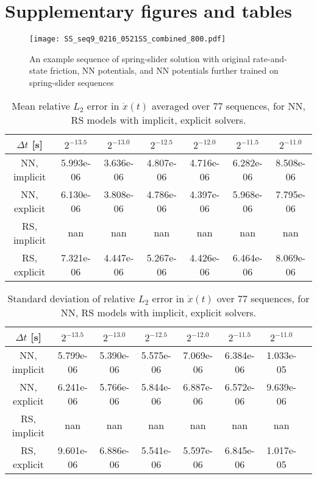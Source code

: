 \newpage
\appendix
\section{Supplementary figures and tables}
\begin{figure}[htb!]
    \centering
    \texttt{[image: SS\_seq9\_0216\_0521SS\_combined\_800.pdf]}
    \caption{An example sequence of spring-slider solution with original rate-and-state friction, 
    NN potentials, 
    and NN potentials further trained on spring-slider sequences}
    \label{fig:SSseq9}
\end{figure}

\begin{table}[htb!]
    \centering
    \begin{tabular}{ccccccc}
        \hline
        $\Delta t$ [s] & $2^{-13.5}$ & $2^{-13.0}$ & $2^{-12.5}$ & $2^{-12.0}$ & $2^{-11.5}$ & $2^{-11.0}$ \\
        \hline
        NN, implicit & 5.993e-06 & 3.636e-06 & 4.807e-06 & 4.716e-06 & 6.282e-06 & 8.508e-06 \\
        NN, explicit & 6.130e-06 & 3.808e-06 & 4.786e-06 & 4.397e-06 & 5.968e-06 & 7.795e-06 \\
        RS, implicit & nan & nan & nan & nan & nan & nan \\
        RS, explicit & 7.321e-06 & 4.447e-06 & 5.267e-06 & 4.426e-06 & 6.464e-06 & 8.069e-06 \\
        \hline
    \end{tabular}
    \caption{Mean relative $L_2$ error in $\dot{x}(t)$ averaged over 77 sequences, 
    for NN, RS models with implicit, explicit solvers.}
    \label{tab:MeanL2ErrorSpringSliderRsVsNNRespective}
\end{table}

\begin{table}[htb!]
    \centering
    \begin{tabular}{cccccccc}
        \hline
        $\Delta t$ [s] & $2^{-13.5}$ & $2^{-13.0}$ & $2^{-12.5}$ & $2^{-12.0}$ & $2^{-11.5}$ & $2^{-11.0}$ \\
        \hline
        NN, implicit & 5.799e-06 & 5.390e-06 & 5.575e-06 & 7.069e-06 & 6.384e-06 & 1.033e-05 \\
        NN, explicit & 6.241e-06 & 5.766e-06 & 5.844e-06 & 6.887e-06 & 6.572e-06 & 9.639e-06 \\
        RS, implicit & nan & nan & nan & nan & nan & nan \\
        RS, explicit & 9.601e-06 & 6.886e-06 & 5.541e-06 & 5.597e-06 & 6.845e-06 & 1.017e-05 \\
        \hline
    \end{tabular}
    \caption{Standard deviation of relative $L_2$ error in $\dot{x}(t)$ over 77 sequences, 
    for NN, RS models with implicit, explicit solvers.}
    \label{tab:StdL2ErrorSpringSliderRsVsNNRespective}
\end{table}